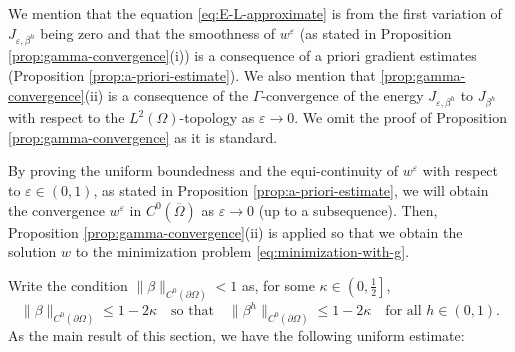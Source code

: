 \documentclass[11pt]{article}
\numberwithin{equation}{section}
\newcommand{\fix}[1]{\textcolor{red}{#1}}
\def\leq{\leqslant}
\begin{document}


We mention that the equation \eqref{eq:E-L-approximate} is from the first variation of $J_{\varepsilon,\beta^h}$ being zero and that the smoothness of $w^{\varepsilon}$ (as stated in Proposition \ref{prop:gamma-convergence}(i)) is a consequence of a priori gradient estimates (Proposition \ref{prop:a-priori-estimate}). We also mention that \ref{prop:gamma-convergence}(ii) is a consequence of the $\Gamma$-convergence of the energy $J_{\varepsilon,\beta^h}$ to $J_{\beta^h}$ with respect to the $L^2(\Omega)$-topology as $\varepsilon\to 0$. We omit the proof of Proposition \ref{prop:gamma-convergence} as it is standard.

By proving the uniform boundedness and the equi-continuity of $w^\varepsilon$ with respect to $\varepsilon\in(0,1)$, as stated in Proposition \ref{prop:a-priori-estimate}, we will obtain the convergence $w^{\varepsilon}$ in $C^0(\overline{\Omega})$ as $\varepsilon\to0$ (up to a subsequence). Then, Proposition \ref{prop:gamma-convergence}(ii) is applied so that we obtain the solution $w$ to the minimization problem \eqref{eq:minimization-with-g}.


\medskip

Write the condition $\|\beta\|_{C^0(\partial\Omega)}<1$ as, for some $\kappa\in\left(0,\frac12\right]$,
\begin{equation}\label{assumption:kappa}
\|\beta\|_{C^0(\partial\Omega)} \leq 1-2\kappa\quad\text{so that}\quad\|\beta^h\|_{C^0(\partial\Omega)} \leq 1-2\kappa\quad\text{for all }h\in(0,1).
\end{equation}
As the main result of this section, we have the following uniform estimate:
\end{document}
